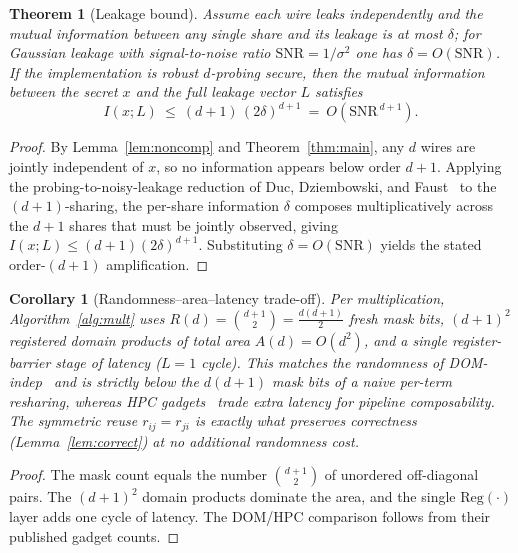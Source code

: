 \documentclass[lettersize,journal]{IEEEtran}
\newtheorem{theorem}{Theorem}
\newtheorem{corollary}{Corollary}
\begin{document}
\begin{theorem}[Leakage bound]
\label{thm:leakage}
Assume each wire leaks independently and the mutual information between any
single share and its leakage is at most $\delta$; for Gaussian leakage with
signal-to-noise ratio $\mathrm{SNR}=1/\sigma^2$ one has $\delta=O(\mathrm{SNR})$.
If the implementation is robust $d$-probing secure, then the mutual information
between the secret $x$ and the full leakage vector $L$ satisfies
\begin{equation}
I(x;L)\ \le\ (d+1)\,(2\delta)^{d+1}\ =\ O\!\left(\mathrm{SNR}^{\,d+1}\right).
\end{equation}
\end{theorem}
\begin{proof}
By Lemma~\ref{lem:noncomp} and Theorem~\ref{thm:main}, any $d$ wires are
jointly independent of $x$, so no information appears below order $d+1$. Applying
the probing-to-noisy-leakage reduction of Duc, Dziembowski, and
Faust~\cite{duc2014unifying} to the $(d{+}1)$-sharing, the per-share information
$\delta$ composes multiplicatively across the $d+1$ shares that must be jointly
observed, giving $I(x;L)\le (d+1)(2\delta)^{d+1}$. Substituting
$\delta=O(\mathrm{SNR})$ yields the stated order-$(d{+}1)$ amplification.
\end{proof}

\begin{corollary}[Randomness--area--latency trade-off]
\label{cor:cost}
Per multiplication, Algorithm~\ref{alg:mult} uses
$R(d)=\binom{d+1}{2}=\tfrac{d(d+1)}{2}$ fresh mask bits, $(d{+}1)^2$ registered
domain products of total area $A(d)=O(d^2)$, and a single register-barrier stage
of latency ($L=1$ cycle). This matches the randomness of
DOM-\emph{indep}~\cite{gross2016dom} and is strictly below the $d(d{+}1)$ mask
bits of a naive per-term resharing, whereas HPC gadgets~\cite{cassiers2020hpc}
trade extra latency for pipeline composability. The symmetric reuse
$r_{ij}=r_{ji}$ is exactly what preserves correctness (Lemma~\ref{lem:correct})
at no additional randomness cost.
\end{corollary}
\begin{proof}
The mask count equals the number $\binom{d+1}{2}$ of unordered off-diagonal
pairs. The $(d{+}1)^2$ domain products dominate the area, and the single
$\mathrm{Reg}(\cdot)$ layer adds one cycle of latency. The DOM/HPC comparison
follows from their published gadget counts.
\end{proof}
\end{document}
